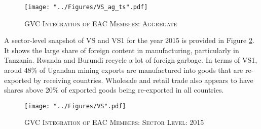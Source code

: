 \documentclass[a4paper]{article}
\begin{document}


\begin{figure}[h!]
\centering
\caption{\label{fig:VSag_ts}\textsc{GVC Integration of EAC Members: Aggregate}}
\texttt{[image: "../Figures/VS\_ag\_ts".pdf]} %
\end{figure}
\FloatBarrier



A sector-level snapshot of VS and VS1 for the year 2015 is provided in Figure \ref{fig:VS}. It shows the large share of foreign content in manufacturing, particularly in Tanzania. Rwanda and Burundi recycle a lot of foreign garbage. In terms of VS1,  aroud 48\% of Ugandan mining exports are manufactured into goods that are re-exported by receiving countries. Wholesale and retail trade also appears to have shares above 20\% of exported goods being re-exported in all countries. 

\begin{figure}[h!]
\centering
\caption{\label{fig:VS}\textsc{GVC Integration of EAC Members: Sector Level: 2015}}
\texttt{[image: "../Figures/VS".pdf]} %
\end{figure}
\FloatBarrier
\end{document}
